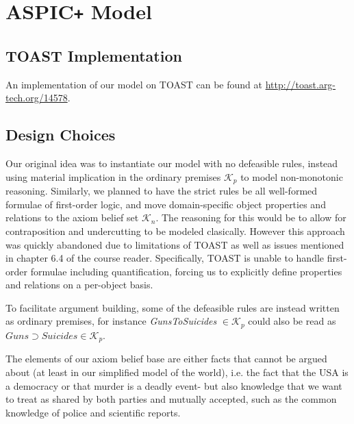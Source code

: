 \documentclass[]{article}
\begin{document}
\section{ASPIC\texttt{+} Model}\label{sec3}
\subsection{TOAST Implementation}
An implementation of our model on TOAST\cite{TOAST} can be found at \url{http://toast.arg-tech.org/14578}.
\subsection{Design Choices}
Our original idea was to instantiate our model with no defeasible rules, instead using material implication in the ordinary premises $\mathcal{K}_p$ to model non-monotonic reasoning. Similarly, we planned to have the strict rules be all well-formed formulae of first-order logic, and move domain-specific object properties and relations to the axiom belief set $\mathcal{K}_n$. The reasoning for this would be to allow for contraposition and undercutting to be modeled clasically. However this approach was quickly abandoned due to limitations of TOAST as well as issues mentioned in chapter 6.4 of the course reader. Specifically, TOAST is unable to handle first-order formulae including quantification, forcing us to explicitly define properties and relations on a per-object basis.

To facilitate argument building, some of the defeasible rules are instead written as ordinary premises, for instance \textit{GunsToSuicides} $\in \mathcal{K}_p$ could also be read as $Guns \supset Suicides \in \mathcal{K}_p$. 

The elements of our axiom belief base are either facts that cannot be argued about (at least in our simplified model of the world), i.e. the fact that the USA is a democracy or that murder is a deadly event- but also knowledge that we want to treat as shared by both parties and mutually accepted, such as the common knowledge of police and scientific reports. 
\end{document}
